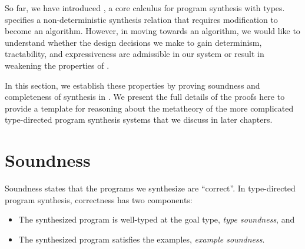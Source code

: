 So far, we have introduced \lsyn{}, a core calculus for program synthesis with types.
\lsyn{} specifies a non-deterministic synthesis relation that requires modification to become an algorithm.
However, in moving towards an algorithm, we would like to understand whether the design decisions we make to gain determinism, tractability, and expressiveness are admissible in our system or result in weakening the properties of \lsyn{}.

In this section, we establish these properties by proving soundness and completeness of synthesis in \lsyn{}.
We present the full details of the proofs here to provide a template for reasoning about the metatheory of the more complicated type-directed program synthesis systems that we discuss in later chapters.

\section{Soundness}

Soundness states that the programs we synthesize are ``correct''.
In type-directed program synthesis, correctness has two components:
\begin{itemize}
  \item The synthesized program is well-typed at the goal type, \emph{type soundness}, and
  \item The synthesized program satisfies the examples, \emph{example soundness}.
\end{itemize}


